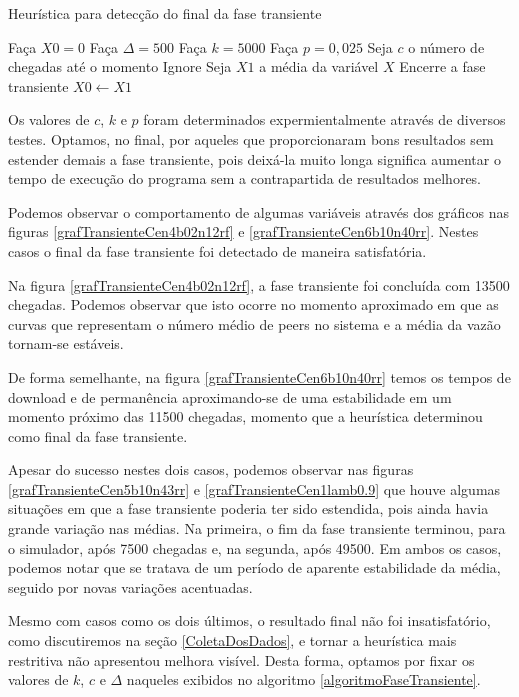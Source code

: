 \documentclass[a4paper,10pt]{article}
\begin{document}
\begin{algorithm}[H]
	\caption{Heurística para detecção do final da fase transiente}
	\label{algoritmoFaseTransiente}
	\begin{algorithmic}
		\STATE Faça $X0 = 0$
		\STATE Faça $\Delta = 500$
		\STATE Faça $k = 5000$
		\STATE Faça $p = 0,025$
		\STATE Seja $c$ o número de chegadas até o momento
				\STATE Ignore
				\STATE Seja $X1$ a média da variável $X$
					\STATE Encerre a fase transiente
				\ELSE
					\STATE $X0 \leftarrow X1$
				\ENDIF
			\ENDIF
		\ENDFOR
	\end{algorithmic}
\end{algorithm}

Os valores de $c$, $k$ e $p$ foram determinados expermientalmente através de diversos testes. Optamos, no final, por aqueles que proporcionaram bons resultados sem estender demais a fase transiente, pois deixá-la muito longa significa aumentar o tempo de execução do programa sem a contrapartida de resultados melhores.

Podemos observar o comportamento de algumas variáveis através dos gráficos nas figuras \ref{grafTransienteCen4b02n12rf} e \ref{grafTransienteCen6b10n40rr}. Nestes casos o final da fase transiente foi detectado de maneira satisfatória.

Na figura \ref{grafTransienteCen4b02n12rf}, a fase transiente foi concluída com 13500 chegadas. Podemos observar que isto ocorre no momento aproximado em que as curvas que representam o número médio de peers no sistema e a média da vazão tornam-se estáveis.

De forma semelhante, na figura \ref{grafTransienteCen6b10n40rr} temos os tempos de download e de permanência aproximando-se de uma estabilidade em um momento próximo das 11500 chegadas, momento que a heurística determinou como final da fase transiente.

Apesar do sucesso nestes dois casos, podemos observar nas figuras \ref{grafTransienteCen5b10n43rr} e \ref{grafTransienteCen1lamb0.9} que houve algumas situações em que a fase transiente poderia ter sido estendida, pois ainda havia grande variação nas médias. Na primeira, o fim da fase transiente terminou, para o simulador, após 7500 chegadas e, na segunda, após 49500. Em ambos os casos, podemos notar que se tratava de um período de aparente estabilidade da média, seguido por novas variações acentuadas.

Mesmo com casos como os dois últimos, o resultado final não foi insatisfatório, como discutiremos na seção \ref{ColetaDosDados}, e tornar a heurística mais restritiva não apresentou melhora visível. Desta forma, optamos por fixar os valores de $k$, $c$ e $\Delta$ naqueles exibidos no algoritmo \ref{algoritmoFaseTransiente}.
\end{document}
